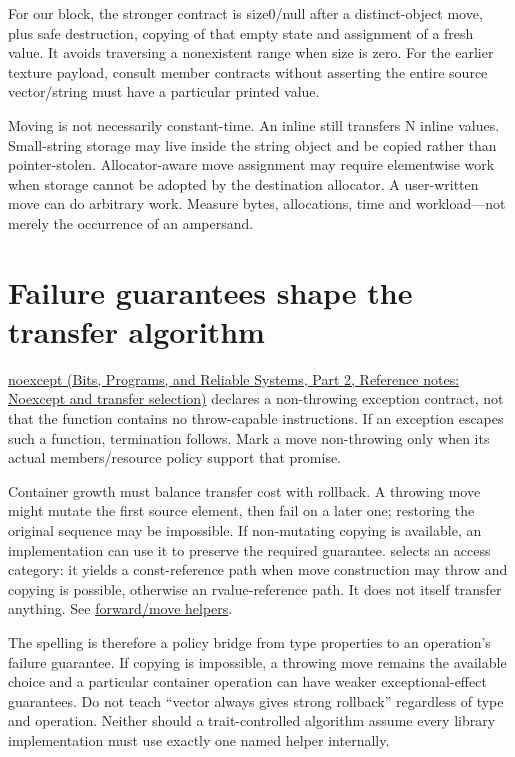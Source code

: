 For our block, the stronger contract is size0/null after a distinct-object move, plus safe destruction, copying of that empty state and assignment of a fresh value. It avoids traversing a nonexistent range when size is zero. For the earlier texture payload, consult member contracts without asserting the entire source vector/string must have a particular printed value.

Moving is not necessarily constant-time. An inline  still transfers N inline values. Small-string storage may live inside the string object and be copied rather than pointer-stolen. Allocator-aware move assignment may require elementwise work when storage cannot be adopted by the destination allocator. A user-written move can do arbitrary work. Measure bytes, allocations, time and workload---not merely the occurrence of an ampersand.

\section{Failure guarantees shape the transfer algorithm}\label{05-engine-i-ch003-failure-guarantees-shape-the-transfer-algorithm}

\hypertarget{05-engine-i-ch003-failure-guarantees-shape-the-transfer-algorithm}{}

\href{../01-Bits-Programs-and-Reliable-Systems-P02/main.pdf\#nameddest=appendix-c746afaa47d1}{noexcept (Bits, Programs, and Reliable Systems, Part 2, Reference notes: Noexcept and transfer selection)} declares a non-throwing exception contract, not that the function contains no throw-capable instructions. If an exception escapes such a function, termination follows. Mark a move non-throwing only when its actual members/resource policy support that promise.

Container growth must balance transfer cost with rollback. A throwing move might mutate the first source element, then fail on a later one; restoring the original sequence may be impossible. If non-mutating copying is available, an implementation can use it to preserve the required guarantee.  selects an access category: it yields a const-reference path when move construction may throw and copying is possible, otherwise an rvalue-reference path. It does not itself transfer anything. See \href{https://eel.is/c++draft/forward}{forward/move helpers}.

The spelling is therefore a policy bridge from type properties to an operation's failure guarantee. If copying is impossible, a throwing move remains the available choice and a particular container operation can have weaker exceptional-effect guarantees. Do not teach ``vector always gives strong rollback'' regardless of type and operation. Neither should a trait-controlled algorithm assume every library implementation must use exactly one named helper internally.

